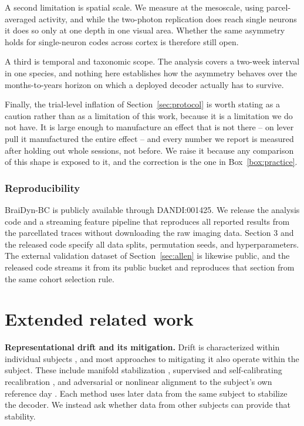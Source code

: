 \documentclass[mlmain,onecolumn]{jmlr}
\begin{document}
A second limitation is spatial scale. We measure at the mesoscale, using parcel-averaged activity,
and while the two-photon replication does reach single neurons it does so only at one depth in one
visual area. Whether the same asymmetry holds for single-neuron codes across cortex is therefore
still open.

A third is temporal and taxonomic scope. The analysis covers a two-week interval in one species, and
nothing here establishes how the asymmetry behaves over the months-to-years horizon on which a
deployed decoder actually has to survive.

Finally, the trial-level inflation of Section~\ref{sec:protocol} is worth stating as a caution
rather than as a limitation of this work, because it is a limitation we do not have. It is large
enough to manufacture an effect that is not there -- on lever pull it manufactured the entire effect
-- and every number we report is measured after holding out whole sessions, not before. We raise it
because any comparison of this shape is exposed to it, and the correction is the one in
Box~\ref{box:practice}.


\subsubsection*{Reproducibility}
BraiDyn-BC is publicly available through DANDI:001425. We release the analysis code and a streaming
feature pipeline that reproduces all reported results from the parcellated traces without downloading
the raw imaging data. Section 3 and the released code specify all data splits, permutation seeds, and
hyperparameters. The external validation dataset of Section~\ref{sec:allen} is likewise public, and
the released code streams it from its public bucket and reproduces that section from the same cohort
selection rule.



\appendix

\section{Extended related work}
\label{app:related}
\textbf{Representational drift and its mitigation.} Drift is characterized within individual
subjects \citep{rule2020,driscoll2017,schoonover2021,rule2019}, and most approaches to mitigating it
also operate within the subject. These include manifold stabilization \citep{degenhart2020},
supervised and self-calibrating recalibration \citep{jarosiewicz2015,wilson2025}, and adversarial or
nonlinear alignment to the subject's own reference day \citep{farshchian2019,karpowicz2025}. Each
method uses later data from the same subject to stabilize the decoder. We instead ask whether data
from other subjects can provide that stability.
\end{document}
